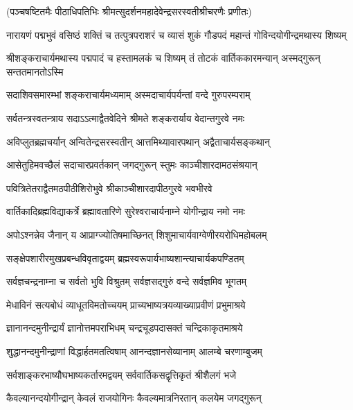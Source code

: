 
(पञ्चषष्टितमैः पीठाधिपतिभिः श्रीमत्सुदर्शनमहादेवेन्द्रसरस्वतीश्रीचरणैः प्रणीतः)

\fourlineindentedshloka
{नारायणं पद्मभुवं वसिष्ठं}
{शक्तिं च तत्पुत्रपराशरं च}
{व्यासं शुकं गौडपदं महान्तं}
{गोविन्दयोगीन्द्रमथास्य शिष्यम्}%

\twolineshloka
{श्रीशङ्कराचार्यमथास्य पद्मपादं च हस्तामलकं च शिष्यम्}
{तं तोटकं वार्तिककारमन्यान् अस्मद्गुरून् सन्ततमानतोऽस्मि}%

\twolineshloka
{सदाशिवसमारम्भां शङ्कराचार्यमध्यमाम्}
{अस्मदाचार्यपर्यन्तां वन्दे गुरुपरम्पराम्}%

\twolineshloka
{सर्वतन्त्रस्वतन्त्राय सदाऽऽत्माद्वैतवेदिने}
{श्रीमते शङ्करार्याय वेदान्तगुरवे नमः}%

\twolineshloka
{अविप्लुतब्रह्मचर्यान् अन्वितेन्द्रसरस्वतीन्}
{आत्तमिथ्यावारपथान् अद्वैताचार्यसङ्कथान्}%

\twolineshloka
{आसेतुहिमवच्छैलं सदाचारप्रवर्तकान्}
{जगद्गुरून् स्तुमः काञ्चीशारदामठसंश्रयान्}%

\twolineshloka
{पवित्रितेतराद्वैतमठपीठीशिरोभुवे}
{श्रीकाञ्चीशारदापीठगुरवे भवभीरवे}%

\twolineshloka
{वार्तिकादिब्रह्मविद्याकर्त्रे ब्रह्मावतारिणे}
{सुरेश्वराचार्यनाम्ने योगीन्द्राय नमो नमः}%

\twolineshloka
{अपोऽश्नन्नेव जैनान् य आप्राग्ज्योतिषमाच्छिनत्}
{शिशुमाचार्यवाग्वेणीरयरोधिमहोबलम्}%

\twolineshloka
{सङ्क्षेपशारीरमुखप्रबन्धविवृताद्वयम्}
{ब्रह्मस्वरूपार्यभाष्यशान्त्याचार्यकपण्डितम्}%

\twolineshloka
{सर्वज्ञचन्द्रनाम्ना च सर्वतो भुवि विश्रुतम्}
{सर्वज्ञसद्गुरुं वन्दे सर्वज्ञमिव भूगतम्}%

\twolineshloka
{मेधाविनं सत्यबोधं व्याधूतविमतोच्चयम्}
{प्राच्यभाष्यत्रयव्याख्याप्रवीणं प्रभुमाश्रये}%

\twolineshloka
{ज्ञानानन्दमुनीन्द्रार्यं ज्ञानोत्तमपराभिधम्}
{चन्द्रचूडपदासक्तं चन्द्रिकाकृतमाश्रये}%

\twolineshloka
{शुद्धानन्दमुनीन्द्राणां विद्धार्हतमतत्विषाम्}
{आनन्दज्ञानसेव्यानाम् आलम्बे चरणाम्बुजम्}%

\twolineshloka
{सर्वशाङ्करभाष्यौघभाष्यकर्तारमद्वयम्}
{सर्ववार्तिकसद्वृत्तिकृतं श्रीशैलगं भजे}%

\twolineshloka
{कैवल्यानन्दयोगीन्द्रान् केवलं राजयोगिनः}
{कैवल्यमात्रनिरतान् कलयेम जगद्गुरून्}%

